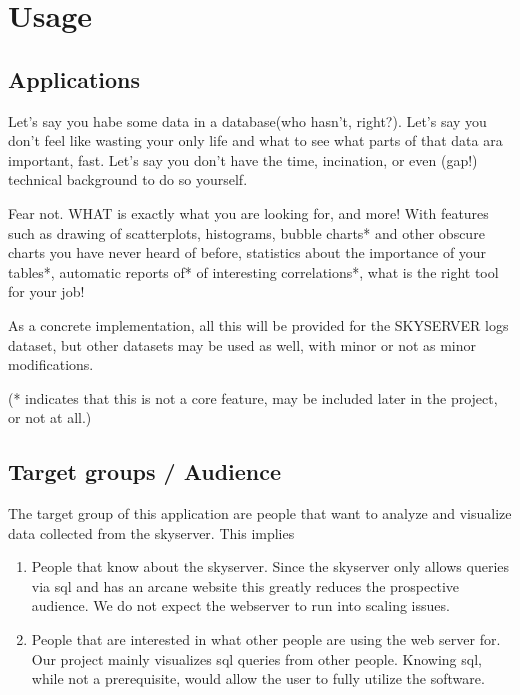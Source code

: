 \section{Usage}

\subsection{Applications}
Let's say you habe some data in a database(who hasn't, right?).
Let's say you don't feel like wasting your only life and what to see what parts of that data ara important, fast.
Let's say you don't have the time, incination, or even (gap!) technical background to do so yourself.

Fear not. WHAT is exactly what you are looking for, and more!
With features such as drawing of scatterplots, histograms, bubble charts* 
and other obscure charts you have never heard of before, statistics about the importance of your tables*,
automatic reports of* of interesting correlations*, what is the right tool for your job!

As a concrete implementation, all this will be provided for the SKYSERVER logs dataset, but other datasets may be
used as well, with minor or not as minor modifications.

(* indicates that this is not a core feature, may be included later in the project, or not at all.)


\subsection{Target groups / Audience}

The target group of this application are people that want to analyze 
and visualize data collected from the skyserver. This implies

\begin{enumerate}
   \item People that know about the skyserver. Since the skyserver only 
   allows queries via sql and has an arcane website this greatly 
   reduces the prospective audience. We do not expect the webserver 
   to run into scaling issues.
  
  \item People that are interested in what other people are 
  using the web server for. Our project mainly visualizes sql queries
   from other people. Knowing sql, while not a prerequisite, 
   would allow the user to fully utilize the software.
  
\end{enumerate}

